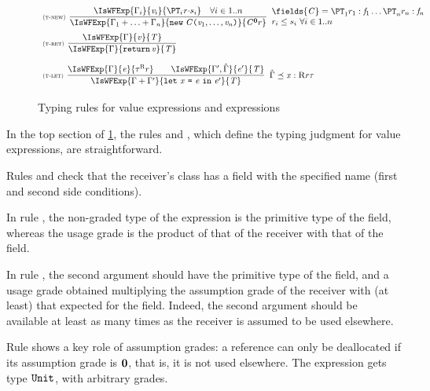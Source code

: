 \begin{figure}
\begin{math}
\begin{array}{l}
\NamedRule{t-new}{\IsWFExp{\Gamma_i}{\ve_i}{\Graded{{\PT_i}}{}{\rgr\rmul\sgr_i}}\Space \forall i\in 1..n}{\IsWFExp{\Gamma_1\ctxsum\ldots\ctxsum\Gamma_n}{\New{\C}{\ve_1,\ldots,\ve_n}}{{\Graded{\C}{\rzero}{\rgr}}}}{
\fields{\C}=\Field{\Graded{\PT_1}{}{\rgr_1}}{\f_1} \ldots \Field{\Graded{\PT_n}{}{\rgr_n}}{\f_n}\\
\rgr_i\leq\sgr_i\ \forall i\in 1..n
 }

\\[3ex]
\NamedRule{t-ret}{\IsWFExp{\Gamma}{\ve}{\T}}{\IsWFExp{\Gamma}{\Return\ve}{\T}}{}
\\[4ex]
\NamedRule{t-let}{
\IsWFExp{\Gamma}{\e}{\Graded{\tau}{\Rgr}{\rgr}}\BigSpace\IsWFExp{\Gamma',\LocalGamma}{\e'}{\T}
}{\IsWFExp{\Gamma\ctxsum\Gamma'}{\Let{\x}{\e}{\e'}}{\T}}
{\LocalGamma\ctxord\CtxElem{\x}{\Rgr}{\rgr}{\tau}
}

\\[2ex]
\end{array}
\end{math}
\caption{Typing rules for value expressions and expressions}
\label{fig:typing-exp} 
\end{figure}


In the top section of \cref{fig:typing-exp}, the rules  and , which define the typing judgment for value expressions,  are straightforward.  

Rules  and  check that the receiver's class has a field with the specified name (first and second side conditions).

In rule , the non-graded type of the expression is the primitive type of the field, whereas the usage grade is the product of that of the receiver with that of the field.

\bez
In rule , the second argument should have the primitive type of the field, and a usage grade obtained multiplying the assumption grade of the receiver with (at least) that expected for the field. 
Indeed, the second argument should be available at least as many times as the receiver is assumed to be used elsewhere. 
\eez

Rule  shows a key role of assumption grades: a reference can only be deallocated if its assumption grade is $\mathbf{0}$, that is, it is not used elsewhere. The expression gets type $\texttt{Unit}$, with arbitrary grades. 

